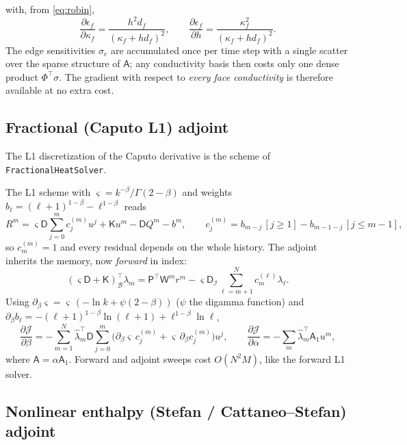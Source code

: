 \documentclass[11pt]{article}
\numberwithin{equation}{section}
\theoremstyle{remark}
\newcommand{\Dm}{\mathsf{D}}           %
\newcommand{\K}{\mathsf{K}}
\newcommand{\Pobs}{\mathsf{P}}
\begin{document}
with, from \eqref{eq:robin},
\begin{equation}
  \frac{\partial\epsilon_f}{\partial\kappa_f}=\frac{h^2d_f}{(\kappa_f+hd_f)^2},\qquad
  \frac{\partial\epsilon_f}{\partial h}=\frac{\kappa_f^2}{(\kappa_f+hd_f)^2}.
\end{equation}
The edge sensitivities $\sigma_e$ are accumulated once per time step with a
single scatter over the sparse structure of $\mathsf A$; any conductivity
basis then costs only one dense product $\Phi^{\!\top}\sigma$.  The gradient
with respect to \emph{every face conductivity} is therefore available at no
extra cost.

\subsection{Fractional (Caputo L1) adjoint}

The L1 discretization of the Caputo derivative \cite{lin2007} is the scheme of
\texttt{FractionalHeatSolver}.

The L1 scheme with $\varsigma=k^{-\beta}/\Gamma(2-\beta)$ and weights
$b_\ell=(\ell+1)^{1-\beta}-\ell^{1-\beta}$ reads
\begin{equation}
  R^m = \varsigma\Dm\sum_{j=0}^m c^{(m)}_ju^j + \K u^m - \Dm Q^m - b^m,
  \qquad c^{(m)}_j = b_{m-j}\,[j\ge1] - b_{m-1-j}\,[j\le m-1],
\end{equation}
so $c^{(m)}_m=1$ and every residual depends on the whole history.  The adjoint
inherits the memory, now \emph{forward} in index:
\begin{equation}
  (\varsigma\Dm+\K)^{\!\top}_{\mathcal B}\lambda_m
  = \Pobs^{\!\top}\mathsf W^mr^m - \varsigma\Dm_{\mathcal I}\sum_{\ell=m+1}^{N}c^{(\ell)}_m\lambda_\ell .
\end{equation}
Using $\partial_\beta\varsigma=\varsigma\,(-\ln k+\psi(2-\beta))$ ($\psi$ the
digamma function) and
$\partial_\beta b_\ell=-(\ell+1)^{1-\beta}\ln(\ell+1)+\ell^{1-\beta}\ln\ell$,
\begin{equation}
  \frac{\partial\mathcal J}{\partial\beta}=-\sum_{m=1}^N\hat\lambda_m^{\!\top}\Dm\sum_{j=0}^m
  \big(\partial_\beta\varsigma\,c_j^{(m)}+\varsigma\,\partial_\beta c_j^{(m)}\big)u^j,
  \qquad
  \frac{\partial\mathcal J}{\partial\alpha}=-\sum_m\hat\lambda_m^{\!\top}\mathsf A_1u^m,
\end{equation}
where $\mathsf A=\alpha\mathsf A_1$.  Forward and adjoint sweeps cost
$O(N^2M)$, like the forward L1 solver.

\subsection{Nonlinear enthalpy (Stefan / Cattaneo--Stefan) adjoint}
\end{document}
